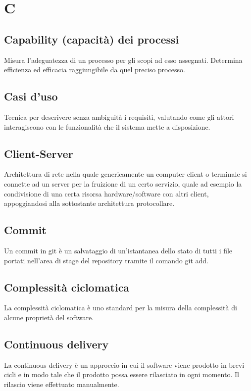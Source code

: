 {	\section{C}
	\subsection{Capability (capacità) dei processi}
	Misura l'adeguatezza di un processo per gli scopi ad esso assegnati. Determina efficienza ed efficacia raggiungibile da quel preciso processo.
	
	\subsection{Casi d'uso}
	Tecnica per descrivere senza ambiguità i requisiti, valutando come gli attori interagiscono con le funzionalità che il sistema mette a disposizione.
	
	\subsection{Client-Server}
	Architettura di rete nella quale genericamente un computer client o terminale si connette ad un server per la fruizione di un certo servizio, quale ad esempio la condivisione di una certa risorsa hardware/software con altri client, appoggiandosi alla sottostante architettura protocollare.
	
	\subsection{Commit}
	Un commit in git è un salvataggio di un'istantanea dello stato di tutti i file portati nell'area di stage del repository tramite il comando git add.
	
	\subsection{Complessità ciclomatica}
	La complessità ciclomatica è uno standard per la misura della complessità di alcune proprietà del software.
	\subsection{Continuous delivery}
	La continuous delivery è un approccio in cui il software viene prodotto in brevi cicli e in modo tale che il prodotto possa essere rilasciato in ogni momento. Il rilascio viene effettuato manualmente.
	
}
